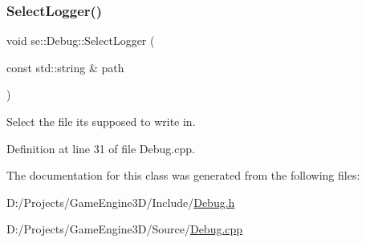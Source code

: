 \mbox{\label{classse_1_1_debug_ab97d44dca8606c2be2cb709f7e82be09}} 
\subsubsection{\texorpdfstring{Select\+Logger()}{SelectLogger()}}
{\footnotesize\ttfamily void se\+::\+Debug\+::\+Select\+Logger (\begin{DoxyParamCaption}\item[{const std\+::string \&}]{path }\end{DoxyParamCaption})}

Select the file it\textquotesingle{}s supposed to write in. 

Definition at line 31 of file Debug.\+cpp.



The documentation for this class was generated from the following files\+:\begin{DoxyCompactItemize}
\item 
D\+:/\+Projects/\+Game\+Engine3\+D/\+Include/\mbox{\hyperlink{_debug_8h}{Debug.\+h}}\item 
D\+:/\+Projects/\+Game\+Engine3\+D/\+Source/\mbox{\hyperlink{_debug_8cpp}{Debug.\+cpp}}\end{DoxyCompactItemize}
